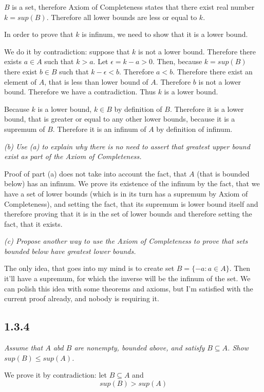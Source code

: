 \documentclass[11pt,oneside,titlepage]{book}
\begin{document}
$B$ is a set, therefore Axiom of Completeness states that there exist real
number $k = sup(B)$. Therefore all lower bounds are less or equal to $k$.

In order to prove that $k$ is infinum, we need to show that it is a lower
bound.

We do it by contradiction: suppose that $k$ is not a lower bound. Therefore
there exists $a \in A$ such that $k > a$. Let $\epsilon = k - a > 0$. Then,
because $k = sup(B)$ there exist $b \in B$ such that $k - \epsilon < b$.
Therefore $a < b$. Therefore there exist an element of $A$, that is less than
lower bound of $A$. Therefore $b$ is not a lower bound. Therefore we have a
contradiction. Thus $k$ is a lower bound.

Because $k$ is a lower bound, $k \in B$ by definition of $B$. Therefore it is
a lower bound, that is greater or equal to any other lower bounds, because it
is a supremum of $B$. Therefore it is an infinum of $A$ by definition of
infinum.

\textit{(b) Use (a) to explain why there is no need to assert that greatest
  upper bound exist as part of the Axiom of Completeness.}

Proof of part (a) does not take into account the fact, that $A$ (that is
bounded below) has an infinum. We prove its existence of the infinum by
the fact, that we have a set of lower bounds (which is in its turn
has a supremum by Axiom of Completeness), and setting the fact, that its
supremum is lower bound itself  and therefore proving that it is in the set of
lower bounds and therefore setting the fact, that it exists.

\textit{(c) Propose another way to use the Axiom of Completeness to prove
  that sets bounded below have greatest lower bounds.}

The only idea, that goes into my mind is to create set $B = \{-a: a \in A\}$.
Then it'll have a supremum, for which the inverse will be the infinum of the
set. We can polish this idea with some theorems and axioms, but I'm satisfied
with the current proof already, and nobody is requiring it.

\subsection*{1.3.4}
\textit{Assume that $A$ abd $B$ are nonempty, bounded above, and satisfy
  $B \subseteq A$. Show $sup(B) \leq sup(A)$.}

We prove it by contradiction: let $B \subseteq A$ and
$$sup(B) > sup(A)$$
\end{document}
